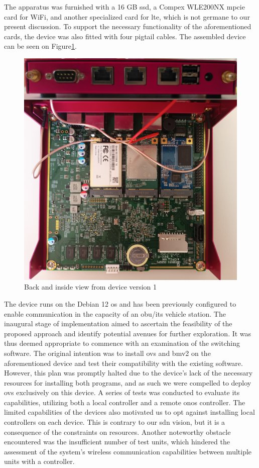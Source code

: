 The apparatus was furnished with a 16 GB \gls{ssd}, a Compex WLE200NX \gls{mpcie} card for WiFi, and another specialized card for \gls{lte}, which is not germane to our present discussion. To support the necessary functionality of the aforementioned cards, the device was also fitted with four pigtail cables. The assembled device can be seen on Figure\ref{fig:device_1}.

\begin{figure}
	\centering
	\includegraphics[width=\textwidth]{Chapters/Figures/Implementation/devices/device_1.jpg}
	\caption{Back and inside view from device version 1}
	\label{fig:device_1}
\end{figure}

The device runs on the Debian 12 \gls{os} and has been previously configured to enable communication in the capacity of an \gls{obu}/\gls{its} vehicle station.
The inaugural stage of implementation aimed to ascertain the feasibility of the proposed approach and identify potential avenues for further exploration. It was thus deemed appropriate to commence with an examination of the switching software. The original intention was to install \gls{ovs} and \gls{bmv2} on the aforementioned device and test their compatibility with the existing software. However, this plan was promptly halted due to the device's lack of the necessary resources for installing both programs, and as such we were compelled to deploy \gls{ovs} exclusively on this device. 
A series of tests was conducted to evaluate its capabilities, utilizing both a local controller and a remote \gls{onos} controller. The limited capabilities of the devices also motivated us to opt against installing local controllers on each device. This is contrary to our \gls{sdn} vision, but it is a consequence of the constraints on resources. Another noteworthy obstacle encountered was the insufficient number of test units, which hindered the assessment of the system's wireless communication capabilities between multiple units with a controller.

